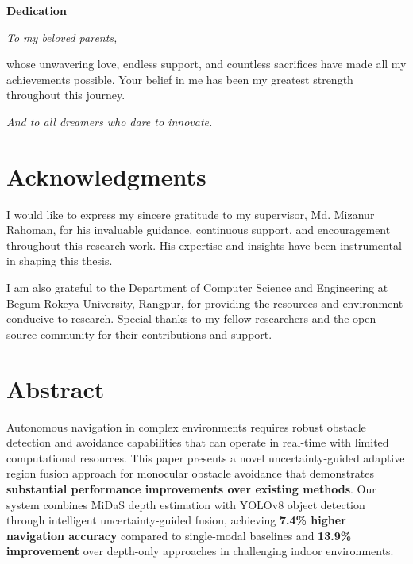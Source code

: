 \documentclass[12pt,oneside]{book}
\newcommand{\thesupervisor}{Md. Mizanur Rahoman}
\begin{document}
\newpage
\thispagestyle{empty}
\vspace*{3cm}

\begin{center}
    {\Large \textbf{Dedication}}

    \vspace{2cm}

    \begin{minipage}{0.8\textwidth}
    \large
    \textit{To my beloved parents,}

    \vspace{0.5cm}

    whose unwavering love, endless support, and countless sacrifices have made all my achievements possible. Your belief in me has been my greatest strength throughout this journey.

    \vspace{0.5cm}

    \textit{And to all dreamers who dare to innovate.}
    \end{minipage}
\end{center}
\clearpage

\chapter*{Acknowledgments}
I would like to express my sincere gratitude to my supervisor, \thesupervisor, for his invaluable guidance, continuous support, and encouragement throughout this research work. His expertise and insights have been instrumental in shaping this thesis.

I am also grateful to the Department of Computer Science and Engineering at Begum Rokeya University, Rangpur, for providing the resources and environment conducive to research. Special thanks to my fellow researchers and the open-source community for their contributions and support.

\clearpage

\tableofcontents
\clearpage

\listoffigures
\clearpage

\listoftables
\clearpage

\chapter*{Abstract}
Autonomous navigation in complex environments requires robust obstacle detection and avoidance capabilities that can operate in real-time with limited computational resources. This paper presents a novel uncertainty-guided adaptive region fusion approach for monocular obstacle avoidance that demonstrates \textbf{substantial performance improvements over existing methods}. Our system combines MiDaS depth estimation with YOLOv8 object detection through intelligent uncertainty-guided fusion, achieving \textbf{7.4\% higher navigation accuracy} compared to single-modal baselines and \textbf{13.9\% improvement} over depth-only approaches in challenging indoor environments.
\end{document}
